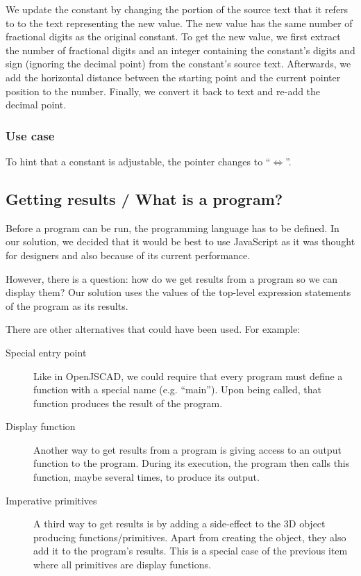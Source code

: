 We update the constant by changing the portion of the source text that it refers to to the text representing the new value.
The new value has the same number of fractional digits as the original constant.
To get the new value, we first extract the number of fractional digits and an integer containing the constant's digits and sign (ignoring the decimal point) from the constant's source text.
Afterwards, we add the horizontal distance between the starting point and the current pointer position to the number.
Finally, we convert it back to text and re-add the decimal point.

\subsubsection{Use case}
To hint that a constant is adjustable, the pointer changes to ``$\Leftrightarrow$''.

\subsection{Getting results / What is a program?}
Before a program can be run, the programming language has to be defined.
In our solution, we decided that it would be best to use JavaScript as it was thought for designers and also because of its current performance.

However, there is a question: how do we get results from a program so we can display them?
Our solution uses the values of the top-level expression statements of the program as its results.

There are other alternatives that could have been used.
For example:
\begin{description}
  \item[Special entry point] Like in OpenJSCAD, we could require that every program must define a function with a special name (e.g. ``main''). Upon being called, that function produces the result of the program.
  \item[Display function] Another way to get results from a program is giving access to an output function to the program. During its execution, the program then calls this function, maybe several times, to produce its output.
  \item[Imperative primitives] A third way to get results is by adding a side-effect to the 3D object producing functions/primitives. Apart from creating the object, they also add it to the program's results. This is a special case of the previous item where all primitives are display functions.
\end{description}

